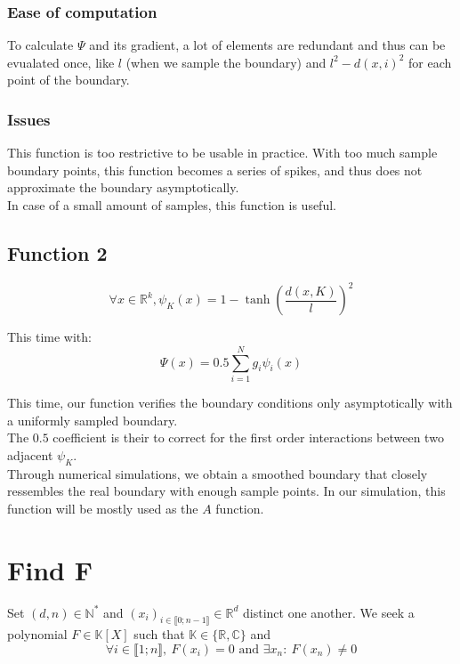 \subsubsection{Ease of computation}
To calculate $\Psi$ and its gradient, a lot of elements are redundant and thus can be evualated once, like $l$ (when we sample the boundary) and $l^2-d(x,i)^2$ for each point of the boundary.

\subsubsection{Issues}
This function is too restrictive to be usable in practice. With too much sample boundary points, this function becomes a series of spikes, and thus does not approximate the boundary asymptotically.\\
In case of a small amount of samples, this function is useful.

\subsection{Function 2}
\begin{equation*}
    \forall x \in \mathbb{R}^k, \psi_K(x)= 1 - \tanh \left( \frac{d(x,K)}{l} \right)^2
\end{equation*}

This time with:
\begin{equation*}
    \Psi(x) = 0.5 \sum_{i=1}^{N}g_i\psi_i(x)
\end{equation*}

This time, our function verifies the boundary conditions only asymptotically with a uniformly sampled boundary.\\
The $0.5$ coefficient is their to correct for the first order interactions between two adjacent $\psi_K$.\\
Through numerical simulations, we obtain a smoothed boundary that closely ressembles the real boundary with enough sample points.
In our simulation, this function will be mostly used as the $A$ function.

\section{Find F}
Set $(d,n)\in \mathbb{N}^*$ and $(x_i)_{i\in \llbracket0;n-1\rrbracket }\in \mathbb{R}^{d}$ distinct one another. We seek a polynomial $F\in\mathbb{K}[X]$ such that $\mathbb{K} \in \{\mathbb{R},\mathbb{C}\}$ and
$$\forall i\in \llbracket1;n\rrbracket,~F(x_i)=0 \text{ and } \exists x_n:~F(x_n)\neq0$$

